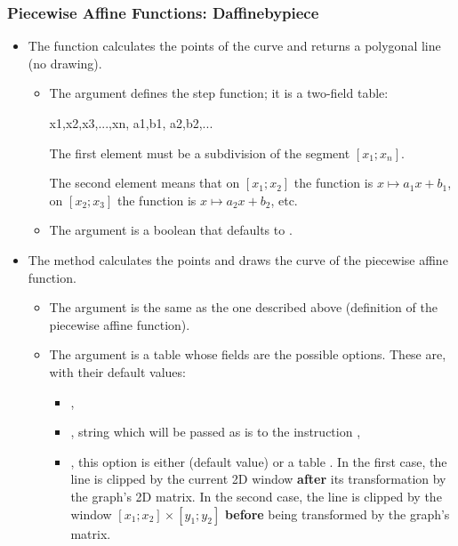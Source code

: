 \subsubsection{Piecewise Affine Functions: Daffinebypiece}

\begin{itemize}
    \item The function  calculates the points of the curve and returns a polygonal line (no drawing).

\begin{itemize}
    \item The argument  defines the step function; it is a two-field table:

\begin{TeXcode}
{ {x1,x2,x3,...,xn}, { {a1,b1}, {a2,b2},...} }
\end{TeXcode}

The first element  must be a subdivision of the segment \([x_1;x_n]\).

The second element  means that on $[x_1;x_2]$ the function is \(x\mapsto a_1x+b_1\), on $[x_2;x_3]$ the function is \(x\mapsto a_2x+b_2\), etc.

    \item The argument  is a boolean that defaults to \true.
\end{itemize}

    \item The method  calculates the points and draws the curve of the piecewise affine function.

\begin{itemize}
    \item The argument  is the same as the one described above (definition of the piecewise affine function).
    \item The argument  is a table whose fields are the possible options. These are, with their default values:

\begin{itemize}
    \item {},
    \item {}, string which will be passed as is to the instruction \drawcmd,
    \item {}, this option is either \nil (default value) or a table . In the first case, the line is clipped by the current 2D window \textbf{after} its transformation by the graph's 2D matrix. In the second case, the line is clipped by the window $[x_1;x_2]\times[y_1;y_2]$ \textbf{before} being transformed by the graph's matrix.
\end{itemize}
\end{itemize}
\end{itemize}

